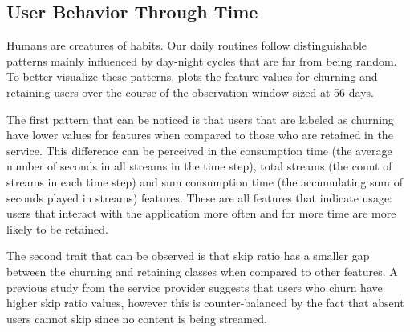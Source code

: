 \documentclass{kththesis}
\begin{document}
\subsection{User Behavior Through Time}

Humans are creatures of habits. Our daily routines follow distinguishable patterns mainly influenced by day-night cycles that are far from being random. To better visualize these patterns,  plots the feature values for churning and retaining users over the course of the observation window sized at 56 days. 

The first pattern that can be noticed is that users that are labeled as churning have lower values for features when compared to those who are retained in the service. This difference can be perceived in the consumption time (the average number of seconds in all streams in the time step), total streams (the count of streams in each time step) and sum consumption time (the accumulating sum of seconds played in streams) features. These are all features that indicate usage: users that interact with the application more often and for more time are more likely to be retained.

The second trait that can be observed is that skip ratio has a smaller gap between the churning and retaining classes when compared to other features. A previous study from the service provider suggests that users who churn have higher skip ratio values, however this is counter-balanced by the fact that absent users cannot skip since no content is being streamed.
	
\end{document}
